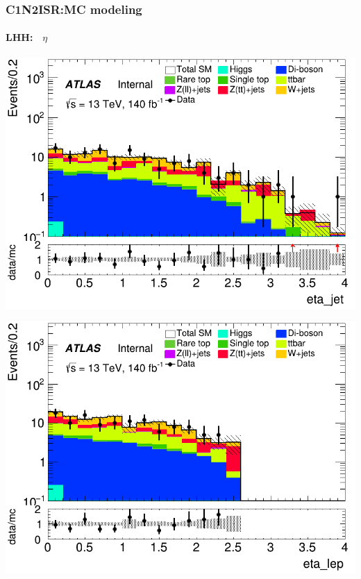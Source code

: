 \documentclass[usenames,dvipsnames]{beamer}
\begin{document}
\begin{frame}
\frametitle{C1N2ISR:MC modeling}
\framesubtitle{LHH:$\quad\eta$}
    \begin{minipage}{0.32\textwidth}
        \centering
        \includegraphics[width=\textwidth]{graphics/LHH_met/LHH_met_eta_jet.png}
    \end{minipage}
    \hfill
    \begin{minipage}{0.32\textwidth}
        \centering
        \includegraphics[width=\textwidth]{graphics/LHH_met/LHH_met_eta_lep.png}
    \end{minipage}
    \hfill
    \begin{minipage}{0.32\textwidth}
        \centering

\end{minipage}
\end{frame}
\end{document}
